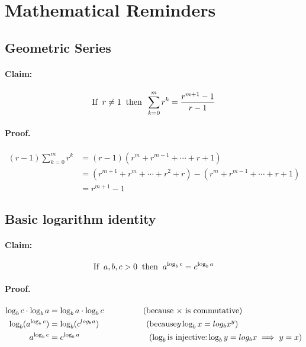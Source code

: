 
\section{Mathematical Reminders}

\subsection{Geometric Series}
\paragraph{Claim:}  
\[ 
    \text{If} \hspace{0.2cm} r \neq 1 \hspace{0.2cm} \text{then} \hspace{0.2cm}
    \sum_{k=0}^m r^k = \frac{r^{m+1}-1}{r-1}
\]
\paragraph{Proof.}
\begin{align*}
    (r-1)\sum_{k=0}^m r^k &= (r-1)(r^m + r^{m-1} + \cdots + r + 1) \\
    &= (r^{m+1} + r^m + \cdots + r^2 + r) - (r^m + r^{m-1} + \cdots + r + 1) \\
    &= r^{m+1} - 1
\end{align*}

\subsection{Basic logarithm identity}
\paragraph{Claim:}  
\[ 
    \text{If} \hspace{0.2cm} a,b,c > 0 \hspace{0.2cm} \text{then} \hspace{0.2cm}
    a^{\log_b c} = c^{\log_b a}
\]
\paragraph{Proof.}
\begin{align*}
    \log_b c \cdot \log_b a & = \log_b a \cdot \log_b c \hspace{1.7cm} 
    \text{(because \(\times\) is commutative)} \\
    \log_b (a^{\log_b c}) & = \log_b(c^{log_b a}) \hspace{2.05cm} 
    (\text{because} y\log_b x = log_b x^y)\\
    a^{\log_b c} & = c^{\log_b a} \hspace{3cm}
    (\log_b \text{is injective:} \log_b y = log_b x \implies y = x)
\end{align*}

